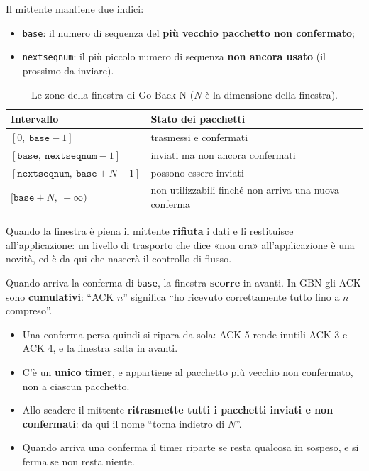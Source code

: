 Il mittente mantiene due indici:

\begin{itemize}
    \item \texttt{base}: il numero di sequenza del \textbf{più vecchio pacchetto non confermato};
    \item \texttt{nextseqnum}: il più piccolo numero di sequenza \textbf{non ancora usato} (il prossimo da inviare).
\end{itemize}

\begin{table}[H]
\centering
\begin{tabular}{ll}
\toprule
\textbf{Intervallo} & \textbf{Stato dei pacchetti} \\
\midrule
$[0,\ \texttt{base}-1]$ & trasmessi e confermati \\
$[\texttt{base},\ \texttt{nextseqnum}-1]$ & inviati ma non ancora confermati \\
$[\texttt{nextseqnum},\ \texttt{base}+N-1]$ & possono essere inviati \\
$[\texttt{base}+N,\ +\infty)$ & non utilizzabili finché non arriva una nuova conferma \\
\bottomrule
\end{tabular}
\caption{Le zone della finestra di Go-Back-N ($N$ è la dimensione della finestra).}
\end{table}

Quando la finestra è piena il mittente \textbf{rifiuta} i dati e li restituisce all'applicazione: un livello di
trasporto che dice «non ora» all'applicazione è una novità, ed è da qui che nascerà il controllo di flusso.

Quando arriva la conferma di \texttt{base}, la finestra \textbf{scorre} in avanti. In GBN gli ACK sono
\textbf{cumulativi}: ``ACK $n$'' significa ``ho ricevuto correttamente tutto fino a $n$ compreso''.
\begin{itemize}
    \item Una conferma persa quindi si ripara da sola: ACK 5 rende inutili ACK 3 e ACK 4, e la finestra salta in avanti.
    \item C'è un \textbf{unico timer}, e appartiene al pacchetto più vecchio non confermato, non a ciascun pacchetto.
    \item Allo scadere il mittente \textbf{ritrasmette tutti i pacchetti inviati e non confermati}: da qui il nome
          ``torna indietro di $N$''.
    \item Quando arriva una conferma il timer riparte se resta qualcosa in sospeso, e si ferma se non resta niente.
\end{itemize}

